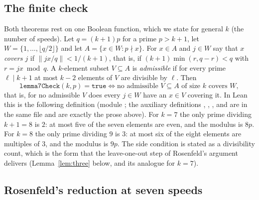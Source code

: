 \documentclass[11pt]{article}
\theoremstyle{remark}
\newcommand{\dist}[1]{\lVert #1\rVert}
\begin{document}
\subsection{The finite check}\label{sec:l7}

Both theorems rest on one Boolean function, which we state for general $k$ (the number of speeds). Let $q=(k+1)p$ for a prime $p>k+1$, let $W=\{1,\dots,\lfloor q/2\rfloor\}$ and let $A=\{x\in W:p\nmid x\}$. For $x\in A$ and $j\in W$ say that \emph{$x$ covers $j$} if $\dist{jx/q}<1/(k+1)$, that is, if $(k+1)\min(r,q-r)<q$ with $r=jx\bmod q$. A $k$-element subset $V\subseteq A$ is \emph{admissible} if for every prime $\ell\mid k+1$ at most $k-2$ elements of $V$ are divisible by $\ell$. Then
\[
\texttt{lemma7Check}(k,p)=\texttt{true}\iff\text{no admissible $V\subseteq A$ of size $k$ covers $W$},
\]
that is, for no admissible $V$ does every $j\in W$ have an $x\in V$ covering it. In Lean this is the following definition (module ; the auxiliary definitions , , ,  and  are in the same file and are exactly the prose above).
For $k=7$ the only prime dividing $k+1=8$ is $2$: at most five of the seven elements are even, and the modulus is $8p$. For $k=8$ the only prime dividing $9$ is $3$: at most six of the eight elements are multiples of $3$, and the modulus is $9p$. The side condition is stated as a divisibility count, which is the form that the leave-one-out step of Rosenfeld's argument delivers (Lemma~\ref{lem:three} below, and its analogue for $k=7$).

\subsection{Rosenfeld's reduction at seven speeds}\label{sec:ros7}
\end{document}
